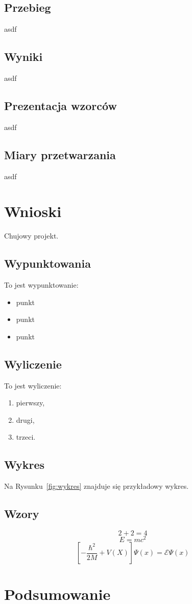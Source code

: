 \documentclass{article}
\begin{document}
\subsection{Przebieg}
asdf
\subsection{Wyniki}
asdf
\subsection{Prezentacja wzorców}
asdf
\subsection{Miary przetwarzania}
asdf

\section{Wnioski}
Chujowy projekt.

\subsection{Wypunktowania}
To jest wypunktowanie:
\begin{itemize}
\item punkt
\item punkt
\item punkt
\end{itemize}
\subsection{Wyliczenie}
To jest wyliczenie:
\begin{enumerate}
\item pierwszy,
\item drugi,
\item trzeci.
\end{enumerate}
\subsection{Wykres}
Na Rysunku~\ref{fig:wykres} znajduje się przykładowy wykres.
\subsection{Wzory}
\begin{equation}
2 + 2 = 4
\end{equation}
\begin{equation}
E = mc^2
\end{equation}
\begin{equation}
\left[- \frac{\hbar^2}{2M} + V(X) \right] \Psi(x)=  \mathcal{E} \Psi(x)
\end{equation}

\section{Podsumowanie}
\end{document}
